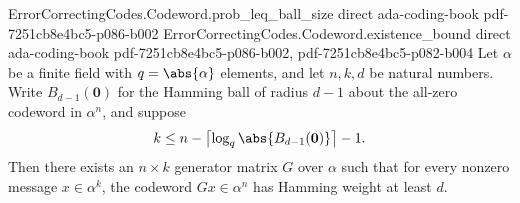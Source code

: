 \begin{theorem}
\proofstep
  {ErrorCorrectingCodes.Codeword.prob_leq_ball_size}
  {direct}
  {ada-coding-book}
  {pdf-7251cb8e4bc5-p086-b002}
\proofstep
  {ErrorCorrectingCodes.Codeword.existence_bound}
  {direct}
  {ada-coding-book}
  {pdf-7251cb8e4bc5-p086-b002,
    pdf-7251cb8e4bc5-p082-b004}
Let $\alpha$ be a finite field with $q = \abs{\alpha}$ elements, and let $n, k, d$ be
natural numbers. Write $B_{d-1}(\mathbf{0})$ for the Hamming ball of radius $d-1$ about
the all-zero codeword in $\alpha^n$, and suppose
\[
k \le n - \bigl\lceil \log_q \abs{B_{d-1}(\mathbf{0})} \bigr\rceil - 1.
\]
Then there exists an $n \times k$ generator matrix $G$ over $\alpha$ such that for every
nonzero message $x \in \alpha^k$, the codeword $Gx \in \alpha^n$ has Hamming weight at
least $d$.
\end{theorem}

